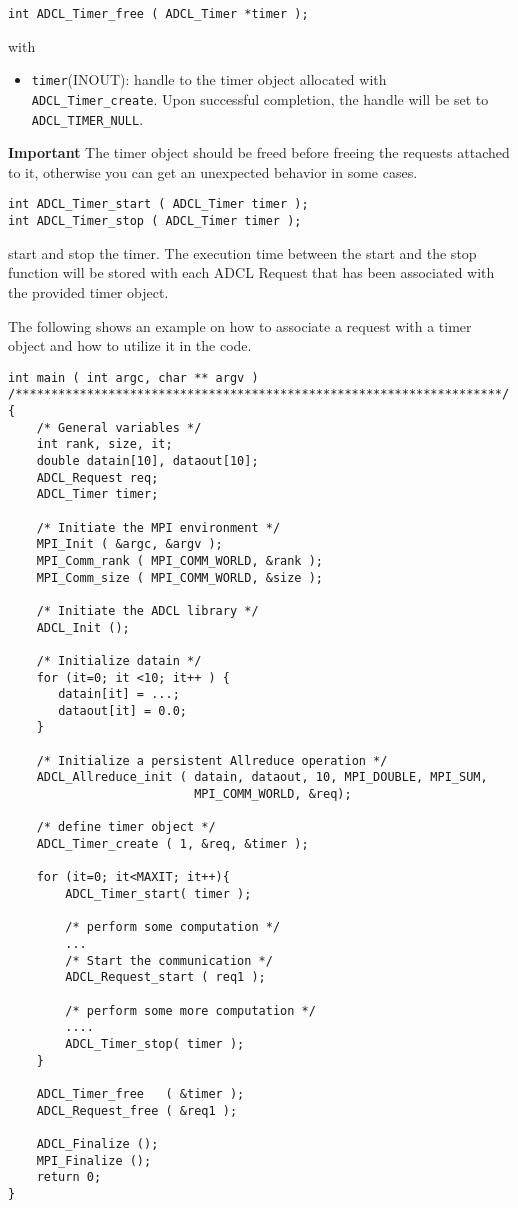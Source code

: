 \begin{verbatim}
int ADCL_Timer_free ( ADCL_Timer *timer );
\end{verbatim}
with
\begin{itemize}
\item {\tt timer}(INOUT): handle to the timer object allocated with {\tt
  ADCL\_Timer\-\_create}.  Upon successful completion, the handle will be set
  to {\tt ADCL\_TIMER\_NULL}.
\end{itemize}

\textbf{Important} The timer object should be freed before freeing the
requests attached to it, otherwise you can get an unexpected behavior in some cases.

\begin{verbatim}
int ADCL_Timer_start ( ADCL_Timer timer );
int ADCL_Timer_stop ( ADCL_Timer timer );
\end{verbatim}
start and stop the timer. The execution time between the start and the stop
function will be stored with each ADCL Request that has been associated with
the provided timer object.


The following shows an example on how to associate a request with a timer
object and how to utilize it in the code.

\begin{verbatim}
int main ( int argc, char ** argv ) 
/********************************************************************/
{
    /* General variables */
    int rank, size, it;
    double datain[10], dataout[10];
    ADCL_Request req;
    ADCL_Timer timer;

    /* Initiate the MPI environment */
    MPI_Init ( &argc, &argv );
    MPI_Comm_rank ( MPI_COMM_WORLD, &rank );
    MPI_Comm_size ( MPI_COMM_WORLD, &size );

    /* Initiate the ADCL library */
    ADCL_Init ();
   
    /* Initialize datain */
    for (it=0; it <10; it++ ) {
       datain[it] = ...;
       dataout[it] = 0.0;
    }

    /* Initialize a persistent Allreduce operation */
    ADCL_Allreduce_init ( datain, dataout, 10, MPI_DOUBLE, MPI_SUM, 
                          MPI_COMM_WORLD, &req);

    /* define timer object */
    ADCL_Timer_create ( 1, &req, &timer );

    for (it=0; it<MAXIT; it++){
        ADCL_Timer_start( timer );

        /* perform some computation */ 
        ...       
        /* Start the communication */
        ADCL_Request_start ( req1 );

        /* perform some more computation */
        ....
        ADCL_Timer_stop( timer );
    }

    ADCL_Timer_free   ( &timer );
    ADCL_Request_free ( &req1 );
    
    ADCL_Finalize ();
    MPI_Finalize ();
    return 0;
}

\end{verbatim}
